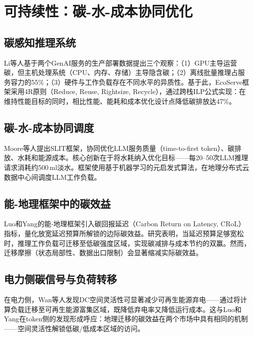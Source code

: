 \documentclass[11pt,twocolumn]{article}
\begin{document}
\section{可持续性：碳-水-成本协同优化}

\subsection{碳感知推理系统}

Li等人\cite{li2025ecoserve}基于两个GenAI服务的生产部署数据提出三个观察：（1）GPU主导运营碳，但主机处理系统（CPU、内存、存储）主导隐含碳；（2）离线批量推理占服务容力的55\%；（3）硬件与工作负载存在不同水平的异质性。基于此，EcoServe框架采用4R原则（Reduce, Reuse, Rightsize, Recycle），通过跨栈ILP公式实现：在维持性能目标的同时，相比性能、能耗和成本优化设计点降低碳排放达47\%。

\subsection{碳-水-成本协同调度}

Moore等人\cite{moore2025slit}提出SLIT框架，协同优化LLM服务质量（time-to-first token）、碳排放、水耗和能源成本。核心创新在于将水耗纳入优化目标——每20--50次LLM推理请求消耗约500\,ml淡水。框架使用基于机器学习的元启发式算法，在地理分布式云数据中心间调度LLM工作负载。

\subsection{能-地理框架中的碳效益}

Luo和Yang\cite{luo2026aiinference}的能-地理框架引入碳回报延迟（Carbon Return on Latency, CRoL）指标，量化放宽延迟预算所解锁的边际碳效益。研究表明，当延迟预算足够宽松时，推理工作负载可迁移至低碳强度区域，实现碳减排与成本节约的双赢。然而，迁移摩擦（状态局部性、数据出口限制）会显著缩减实际碳效益。

\subsection{电力侧碳信号与负荷转移}

在电力侧，Wan等人\cite{wan2025grid}发现DC空间灵活性可显著减少可再生能源弃电——通过将计算负载迁移至可再生能源富集区域，既降低弃电率又降低运行成本。这与Luo和Yang\cite{luo2026aiinference}在token侧的发现形成呼应：地理迁移的碳效益在两个市场中具有相同的机制——空间灵活性解锁低碳/低成本区域的访问。
\end{document}
